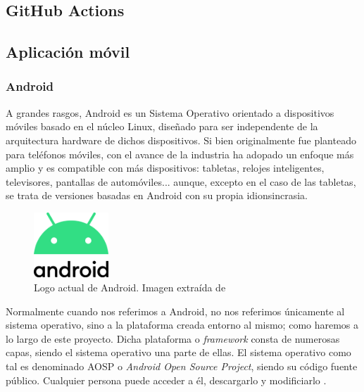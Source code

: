             
        \subsection{GitHub Actions}

    \subsection{Aplicación móvil}

        \subsubsection{Android}

            A grandes rasgos, Android es un Sistema Operativo orientado a dispositivos móviles basado en el núcleo 
            Linux, diseñado para ser independente de la arquitectura hardware de dichos dispositivos. 
            Si bien originalmente fue planteado para teléfonos móviles, con el avance de la industria ha adopado 
            un enfoque más amplio y es compatible con más dispositivos: tabletas, relojes inteligentes, televisores, 
            pantallas de automóviles... aunque, excepto en el caso de las tabletas, se trata de versiones basadas en
            Android con su propia idionsincrasia. \newline

            \begin{figure}[h]
                \centering
                \includegraphics[width=0.25\textwidth]{figures/Android logo.png}
                \caption[Logo actual de Android.]
                {Logo actual de Android. Imagen extraída de \cite{vulcansphere_english_2019}}
                \label{figure:android:logo}
            \end{figure}

            Normalmente cuando nos referimos a Android, no nos referimos únicamente al sistema operativo, sino a la
            plataforma creada entorno al mismo; como haremos a lo largo de este proyecto. Dicha plataforma o 
            \textit{framework} consta de numerosas capas, siendo el sistema operativo una parte de ellas. El sistema 
            operativo como tal es denominado AOSP o \textit{Android Open Source Project}, siendo su código fuente 
            público. Cualquier persona puede acceder a él, descargarlo y modificiarlo \cite{collado_que_2022}.

